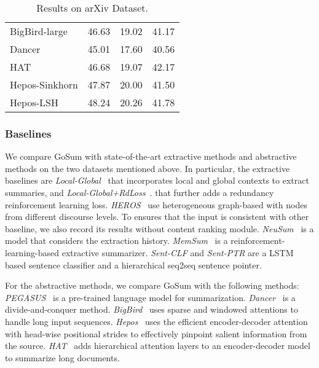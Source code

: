 \documentclass[11pt,a4paper]{article}
\begin{document}
\begin{table}[t]
\begin{tabular}{p{36mm}|p{8mm}p{8mm}p{8mm}}
          BigBird-large                 & 46.63 & 19.02 & 41.17  \\
          Dancer                        & 45.01 & 17.60 & 40.56  \\
          HAT                           & 46.68 & 19.07 & 42.17  \\
          Hepos-Sinkhorn                & 47.87 & 20.00 & 41.50  \\
          Hepos-LSH                     & 48.24 & 20.26 & 41.78  \\
          \bottomrule
  \end{tabular}
  \caption{Results on arXiv Dataset.} \label{tab:sota_arxiv}
\end{table}




 \subsubsection{Baselines}
We compare GoSum with state-of-the-art extractive methods and abstractive methods on the two datasets mentioned above.
In particular, the extractive baselines are \textit{Local-Global}~  that incorporates local and global contexts to extract summaries, and \textit{Local-Global+RdLoss}~. 
that further adds a redundancy reinforcement learning loss. 
\textit{HEROS}~\cite{discourse_2021} use heterogeneous graph-based with nodes from different discourse levels.
To ensures that the input is consistent with other baseline, we also record its results without content ranking module. 
\textit{NeuSum}~ is a model that considers the extraction history. 
\textit{MemSum}~ is a reinforcement-learning-based extractive summarizer.
\textit{Sent-CLF} and \textit{Sent-PTR} \cite{clfptr_2020} are a LSTM based sentence classifier and a hierarchical seq2seq sentence pointer.

For the abstractive methods, we compare GoSum with the following methods:
\textit{PEGASUS}~\cite{pegasus_2020} is a pre-trained language model for summarization.
\textit{Dancer}~\cite{dancer_2020} is a divide-and-conquer method.
\textit{BigBird}~ uses sparse and windowed attentions to handle long input sequences.
\textit{Hepos}~\cite{hepo_2021} uses the efficient encoder-decoder attention with head-wise positional strides to effectively pinpoint salient information from the source.
\textit{HAT}~\cite{hat_2021} adds hierarchical attention layers to an encoder-decoder model to summarize long documents.
\end{document}
